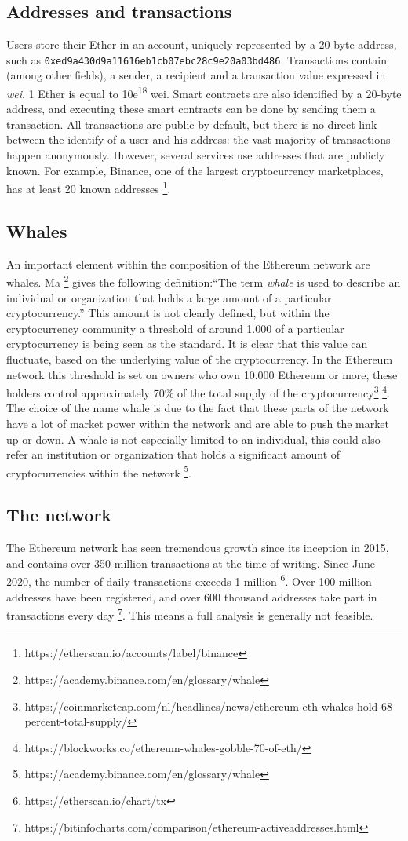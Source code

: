 \documentclass[10pt,a4paper]{article}
\begin{document}
\begin{multicols}{2}
\subsection{Addresses and transactions}
Users store their Ether in an account, uniquely represented by a 20-byte address, such as \texttt{0xed9a430d9a11616eb1cb07ebc28c9e20a03bd486}. Transactions contain (among other fields), a sender, a recipient and a transaction value expressed in \textit{wei}. 1 Ether is equal to 10e\textsuperscript{18} wei. Smart contracts are also identified by a 20-byte address, and executing these smart contracts can be done by sending them a transaction. All transactions are public by default, but there is no direct link between the identify of a user and his address: the vast majority of transactions happen anonymously. However, several services use addresses that are publicly known. For example, Binance, one of the largest cryptocurrency marketplaces, has at least 20 known addresses \footnote{https://etherscan.io/accounts/label/binance}.
\subsection{Whales}
An important element within the composition of the Ethereum network are whales. Ma \footnote{https://academy.binance.com/en/glossary/whale} gives the following definition:“The term \textit {whale} is used to describe an individual or organization that holds a large amount of a particular cryptocurrency.” This amount is not clearly defined, but within the cryptocurrency community a threshold of around 1.000 of a particular cryptocurrency is being seen as the standard. It is clear that this value can fluctuate, based on the underlying value of the cryptocurrency. In the Ethereum network this threshold is set on owners who own 10.000 Ethereum or more, these holders control approximately 70\% of the total supply of the cryptocurrency\footnote {https://coinmarketcap.com/nl/headlines/news/ethereum-eth-whales-hold-68-percent-total-supply/} \footnote {https://blockworks.co/ethereum-whales-gobble-70-of-eth/}. The choice of the name whale is due to the fact that these parts of the network have a lot of market power within the network and are able to push the market up or down. A whale is not especially limited to an individual, this could also refer an institution or organization that holds a significant amount of cryptocurrencies within the network \footnote{https://academy.binance.com/en/glossary/whale}.


\subsection{The network}
The Ethereum network has seen tremendous growth since its inception in 2015, and contains over 350 million transactions at the time of writing. Since June 2020, the number of daily transactions exceeds 1 million \footnote{https://etherscan.io/chart/tx}. Over 100 million addresses have been registered, and over 600 thousand addresses take part in transactions every day \footnote{https://bitinfocharts.com/comparison/ethereum-activeaddresses.html}. This means a full analysis is generally not feasible.


\end{multicols}
\end{document}
